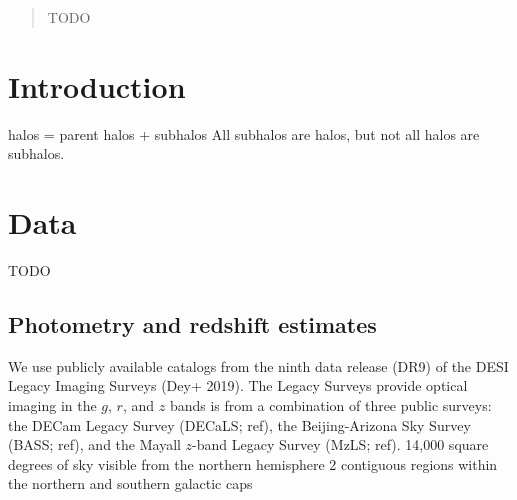 \documentclass[twocolumn,apj,iop,tighten]{emulateapj2}
\begin{document}
\title{}

\author{Angela M.\ Berti,
}
	

\begin{abstract}
TODO
\end{abstract}

\section{Introduction}\label{sec:intro}

halos = parent halos + subhalos
All subhalos are halos, but not all halos are subhalos.

\section{Data}\label{sec:data}

TODO

\subsection{Photometry and redshift estimates}\label{subsec:photometry}
We use publicly available catalogs from the ninth data release (DR9) of the DESI Legacy Imaging Surveys (Dey+ 2019). The Legacy Surveys provide optical imaging in the $g$, $r$, and $z$ bands is from a combination of three public surveys: the DECam Legacy Survey (DECaLS; ref),
the Beijing-Arizona Sky Survey (BASS; ref),
and the Mayall $z$-band Legacy Survey (MzLS; ref).
14,000 square degrees of sky visible from the northern hemisphere
2 contiguous regions within the northern and southern galactic caps
\end{document}
